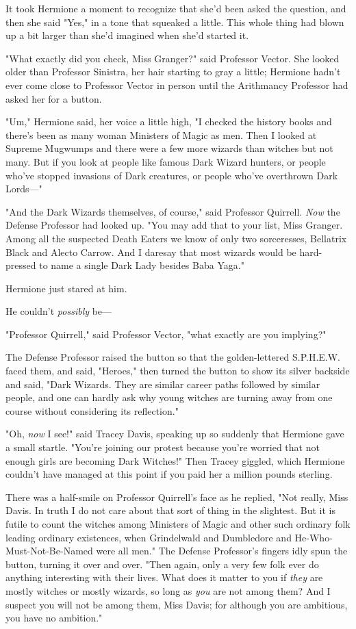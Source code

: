 It took Hermione a moment to recognize that she'd been asked the question, and 
then she said "Yes," in a tone that squeaked a little. This whole thing had 
blown up a bit larger than she'd imagined when she'd started it.

"What exactly did you check, Miss Granger?" said Professor Vector. She looked 
older than Professor Sinistra, her hair starting to gray a little; Hermione 
hadn't ever come close to Professor Vector in person until the Arithmancy 
Professor had asked her for a button.

"Um," Hermione said, her voice a little high, "I checked the history books and 
there's been as many woman Ministers of Magic as men. Then I looked at Supreme 
Mugwumps and there were a few more wizards than witches but not many. But if 
you look at people like famous Dark Wizard hunters, or people who've stopped 
invasions of Dark creatures, or people who've overthrown Dark Lords---"

"And the Dark Wizards themselves, of course," said Professor Quirrell. 
\emph{Now} the Defense Professor had looked up. "You may add that to your list, 
Miss Granger. Among all the suspected Death Eaters we know of only two 
sorceresses, Bellatrix Black and Alecto Carrow. And I daresay that most wizards 
would be hard-pressed to name a single Dark Lady besides Baba Yaga."

Hermione just stared at him.

He couldn't \emph{possibly} be---

"Professor Quirrell," said Professor Vector, "what exactly are you implying?"

The Defense Professor raised the button so that the golden-lettered S.P.H.E.W. 
faced them, and said, "Heroes," then turned the button to show its silver 
backside and said, "Dark Wizards. They are similar career paths followed by 
similar people, and one can hardly ask why young witches are turning away from 
one course without considering its reflection."

"Oh, \emph{now} I see!" said Tracey Davis, speaking up so suddenly that 
Hermione gave a small startle. "You're joining our protest because you're 
worried that not enough girls are becoming Dark Witches!" Then Tracey giggled, 
which Hermione couldn't have managed at this point if you paid her a million 
pounds sterling.

There was a half-smile on Professor Quirrell's face as he replied, "Not really, 
Miss Davis. In truth I do not care about that sort of thing in the slightest. 
But it is futile to count the witches among Ministers of Magic and other such 
ordinary folk leading ordinary existences, when Grindelwald and Dumbledore and 
He-Who-Must-Not-Be-Named were all men." The Defense Professor's fingers idly 
spun the button, turning it over and over. "Then again, only a very few folk 
ever do anything interesting with their lives. What does it matter to you if 
\emph{they} are mostly witches or mostly wizards, so long as \emph{you} are not 
among them? And I suspect you will not be among them, Miss Davis; for although 
you are ambitious, you have no ambition."

